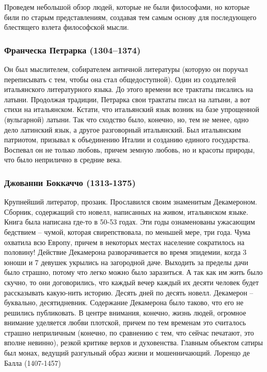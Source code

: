 Проведем небольшой обзор людей, которые не были философами, но которые били по старым представлениям, создавая тем самым основу для последующего блестящего взлета философской мысли.
\subsubsection{Франческа Петрарка (1304–1374)}

Он был мыслителем, собирателем античной литературы (которую он поручал переписывать с тем, чтобы она стал общедоступной). Один из создателей итальянского литературного языка. До этого времени все трактаты писались на латыни. Продолжая традиции, Петрарка свои трактаты писал на латыни, а вот стихи на итальянском. Кстати, что итальянский язык возник на базе упрощенной (вульгарной) латыни. Так что сходство было, конечно, но, тем не менее, одно дело латинский язык, а другое разговорный итальянский. Был итальянским патриотом, призывал к объединению Италии и созданию единого государства. Воспевал он не только любовь, причем земную любовь, но и красоты природы, что было неприлично в средние века.
\subsubsection{Джованни Боккаччо (1313-1375)}

Крупнейший литератор, прозаик. Прославился своим знаменитым Декамероном. Сборник, содержащий сто новелл, написанных на живом, итальянском языке. Книга была написана где-то в 50-53 годах. Эти годы ознаменованы ужасающим бедствием – чумой, которая свирепствовала, по меньшей мере, три года. Чума охватила всю Европу, причем в некоторых местах население сократилось на половину! Действие Декамерона разворачивается во время эпидемии, когда 3 юноши и 7 девушек укрылись на загородной даче. Выходить за пределы дачи было страшно, потому что легко можно было заразиться. А так как им жить было скучно, то они договорились, что каждый вечер каждый их десяти человек будет рассказывать какую-нить историю. Десять дней по десять новелл. Декамерон – буквально, десятидневник. Содержание Декамерона было таково, что его не решились публиковать. В центре внимания, конечно, жизнь людей, огромное внимание уделяется любви плотской, причем по тем временам это считалось страшно неприличным (конечно, по сравнению с тем, что сейчас печатают, это вполне невинно), резкой критике верхов и духовенства. Главным объектом сатиры был монах, ведущий разгульный образ жизни и мошенничающий.
Лоренцо де Балла (1407-1457)

